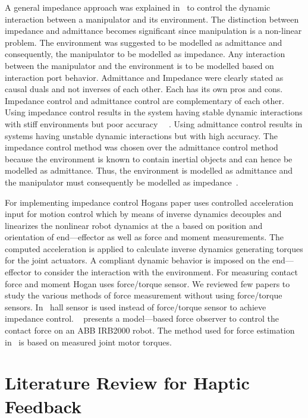 \documentclass[10pt,journal,compsoc]{IEEEtran}
\begin{document}
A general impedance approach was explained in~\cite{hogan1984} to control the dynamic interaction between a manipulator and its environment. The distinction between impedance and admittance becomes significant since manipulation is a non-linear problem. The environment was suggested to be modelled as admittance and consequently, the manipulator to be modelled as impedance. Any interaction between the manipulator and the environment is to be modelled based on interaction port behavior. Admittance and Impedance were clearly stated as causal duals and not inverses of each other. Each has its own pros and cons. Impedance control and admittance control are complementary of each other. Using impedance control results in the system having stable dynamic interactions with stiff environments but poor accuracy~\cite{hogan1984} ~\cite{soares2013}. Using admittance control results in systems having unstable dynamic interactions but with high accuracy. The impedance control method was chosen over the admittance control method because the environment is known to contain inertial objects and can hence be modelled as admittance. Thus, the environment is modelled as admittance and the manipulator must consequently be modelled as impedance~\cite{hogan1984}.

For implementing impedance control Hogan\textquotesingle s paper uses controlled acceleration input for motion control which by means of inverse dynamics decouples and linearizes the nonlinear robot dynamics at the a based on position and orientation of end---effector as well as force and moment measurements. The computed acceleration is applied to calculate inverse dynamics generating torques for the joint actuators. A compliant dynamic behavior is imposed on the end---effector to consider the interaction with the environment. For measuring contact force and moment Hogan uses force/torque sensor.  We reviewed few papers to study the various methods of force measurement without using force/torque sensors.  In~\cite{huang2013} hall sensor is used instead of force/torque sensor to achieve impedance control. ~\cite{alcocera2004force} presents a model---based force observer to control the contact force on an ABB IRB2000 robot. The method used for force estimation in~\cite{linderoth2013} is based on measured joint motor torques. 

\section{Literature Review for Haptic Feedback}
\end{document}
